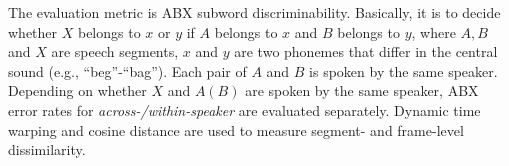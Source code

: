 \documentclass[a4paper]{article}
\begin{document}
The evaluation metric is ABX subword discriminability. Basically, it is to decide whether $X$ belongs to $x$ or $y$ if $A$ belongs to $x$ and $B$ belongs to $y$, where $A, B$ and $X$ are speech segments, $x$ and $y$ are two phonemes  that differ in the central sound (e.g., ``beg''-``bag''). Each pair of $A$ and $B$ is spoken by the same speaker. Depending on whether $X$ and $A(B)$ are spoken by the same speaker, ABX error rates for \textit{across-/within-speaker} are evaluated separately. Dynamic time warping and cosine distance are used to measure segment- and frame-level dissimilarity.
\end{document}
